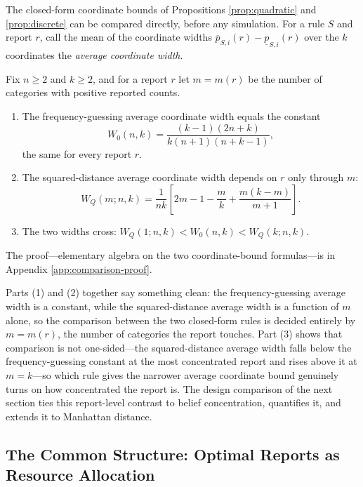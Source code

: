 The closed-form coordinate bounds of Propositions \ref{prop:quadratic} and \ref{prop:discrete} can be compared directly, before any simulation.
For a rule \(S\) and report \(r\), call the mean of the coordinate widths \(\overline p_{S,i}(r)-\underline p_{S,i}(r)\) over the \(k\) coordinates the \emph{average coordinate width}.

\begin{corollary}\label{cor:closed-form-comparison}
Fix \(n\ge2\) and \(k\ge2\), and for a report \(r\) let \(m=m(r)\) be the number of categories with positive reported counts.
\begin{enumerate}
\item The frequency-guessing average coordinate width equals the constant
\[
W_0(n,k)=\frac{(k-1)(2n+k)}{k(n+1)(n+k-1)},
\]
the same for every report \(r\).
\item The squared-distance average coordinate width depends on \(r\) only through \(m\):
\[
W_Q(m;n,k)=\frac{1}{nk}\left[2m-1-\frac{m}{k}+\frac{m(k-m)}{m+1}\right].
\]
\item The two widths cross: \(W_Q(1;n,k)<W_0(n,k)<W_Q(k;n,k)\).
\end{enumerate}
\end{corollary}

The proof---elementary algebra on the two coordinate-bound formulas---is in Appendix \ref{app:comparison-proof}.

Parts (1) and (2) together say something clean: the frequency-guessing average width is a constant, while the squared-distance average width is a function of \(m\) alone, so the comparison between the two closed-form rules is decided entirely by \(m=m(r)\), the number of categories the report touches.
Part (3) shows that comparison is not one-sided---the squared-distance average width falls below the frequency-guessing constant at the most concentrated report and rises above it at \(m=k\)---so which rule gives the narrower average coordinate bound genuinely turns on how concentrated the report is.
The design comparison of the next section ties this report-level contrast to belief concentration, quantifies it, and extends it to Manhattan distance.

\subsection{The Common Structure: Optimal Reports as Resource Allocation}

